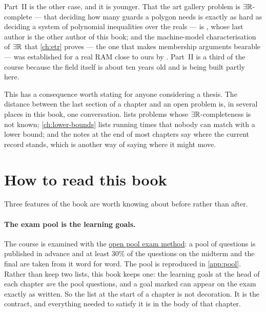 Part~II is the other case, and it is younger. That the art gallery problem is
$\exists\mathbb{R}$-complete --- that deciding how many guards a polygon needs is exactly as
hard as deciding a system of polynomial inequalities over the reals --- is
\citet{AbrahamsenAdamaszekMiltzow2022}, whose last author is the other author
of this book; and the machine-model characterisation of $\exists\mathbb{R}$ that
\cref{ch:etr} proves --- the one that makes membership arguments bearable ---
was established for a real RAM close to ours by
\citet{EricksonVanDerHoogMiltzow2024}. Part~II is a third of the course because
the field itself is about ten years old and is being built partly here.

This has a consequence worth stating for anyone considering a thesis. The
distance between the last section of a chapter and an open problem is, in
several places in this book, one conversation.  lists
problems whose $\exists\mathbb{R}$-completeness is not known; \cref{ch:lower-bounds} lists
running times that nobody can match with a lower bound; and the notes at the
end of most chapters say where the current record stands, which is another way
of saying where it might move.

\section{How to read this book}
\label{sec:intro-how-to-read}

Three features of the book are worth knowing about before rather than after.

\paragraph{The exam pool is the learning goals.}
The course is examined with the
\href{https://openpoolexams.science.uu.nl/}{open pool exam method}: a pool of
questions is published in advance and at least $30\%$ of the questions on the
midterm and the final are taken from it word for word. The pool is reproduced
in \cref{app:pool}. Rather than keep two lists, this book keeps one: the
learning goals at the head of each chapter \emph{are} the pool questions, and a
goal marked \pooltag{} can appear on the exam exactly as written. So the list
at the start of a chapter is not decoration. It is the contract, and everything
needed to satisfy it is in the body of that chapter.

